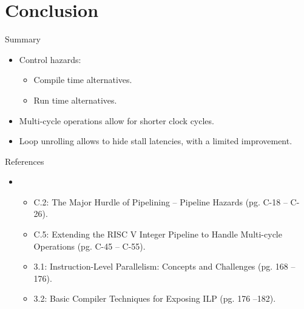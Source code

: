 \section{Conclusion}

\begin{frame}[t]{Summary}
\begin{itemize}
  \item Control hazards:
    \begin{itemize}
      \item Compile time alternatives.
      \item Run time alternatives.
    \end{itemize}

  \item Multi-cycle operations allow for shorter clock cycles.

  \item Loop unrolling allows to hide stall latencies, with a limited improvement.

\end{itemize}
\end{frame}


\begin{frame}[t]{References}
\begin{itemize}
  \item \bibhennessy
    \begin{itemize}
      \item C.2: The Major Hurdle of Pipelining -- Pipeline Hazards (pg. C-18 -- C-26).
      \item C.5: Extending the RISC V Integer Pipeline to Handle Multi-cycle Operations (pg. C-45 -- C-55).
      \item 3.1: Instruction-Level Parallelism: Concepts and Challenges (pg. 168 -- 176).
      \item 3.2: Basic Compiler Techniques for Exposing ILP (pg. 176 --182).
    \end{itemize}

\end{itemize}
\end{frame}
